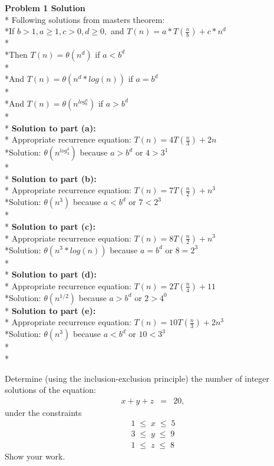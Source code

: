 \documentclass{article}
\begin{document}
\textbf{Problem 1 Solution}
\\*
Following solutions from masters theorem: 
\\*If $b > 1, a \geq 1, c > 0, d \geq 0,$ and $T(n) = a*T(\frac{n}{b}) + c*n^d$
\\*\\*Then $T(n) = \theta(n^d)$ if $a < b^d$
\\*\\*And $T(n) = \theta(n^d * log(n))$ if $a = b^d$
\\*\\*And $T(n) = \theta(n^{log_b^a})$ if $a > b^d$
\\*\\*
\textbf{Solution to part (a):}
\\*
Appropriate recurrence equation: $T(n) = 4T(\frac{n}{3}) + 2n$
\\*Solution: $\theta(n^{log_3^4})$ because $a > b^d$ or $4 > 3^1$
\\*\\*
\textbf{Solution to part (b):}
\\*
Appropriate recurrence equation: $T(n) = 7T(\frac{n}{2}) + n^3$
\\*Solution: $\theta(n^3)$ because $a < b^d$ or $7 < 2^3$
\\*\\*
\textbf{Solution to part (c):}
\\*
Appropriate recurrence equation: $T(n) = 8T(\frac{n}{2}) + n^3$
\\*Solution: $\theta(n^3 * log(n))$ because $a = b^d$ or $8 = 2^3$
\\*\\*
\textbf{Solution to part (d):}
\\*
Appropriate recurrence equation: $T(n) = 2T(\frac{n}{4}) + 11$
\\*Solution: $\theta(n^{1/2})$ because $a > b^d$ or $2 > 4^0$
\\*
\textbf{Solution to part (e):}
\\*
Appropriate recurrence equation: $T(n) = 10T(\frac{n}{3}) + 2n^3$
\\*Solution: $\theta(n^3)$ because $a < b^d$ or $10 < 3^3$
\\*\\*




\begin{problem}
Determine (using the inclusion-exclusion principle)
the number of integer solutions of the equation:
%
\begin{eqnarray*}
x + y + z &=& 20,
\end{eqnarray*}
%
under the constraints 
%
\begin{eqnarray*}
        1 \;\le\; x \;\le\; 5 \\
        3 \;\le\; y \;\le\; 9 \\
        1\;\le\; z  \;\le\; 8
\end{eqnarray*}
%
Show your work.
\end{problem}
\end{document}
